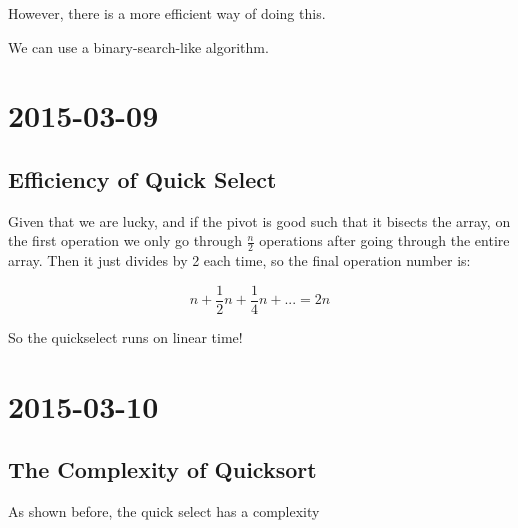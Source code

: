 \documentclass [12 pt, twoside] {article}
\begin{document}
However, there is a more efficient way of doing this.

We can use a binary-search-like algorithm. 

\section{2015-03-09}
\subsection{Efficiency of Quick Select}

Given that we are lucky, and if the pivot is good such that it bisects the
array, on the first operation we only go through $\frac{n}{2}$ operations after
going through the entire array. Then it just divides by 2 each time, so the
final operation number is:

$$n + \frac{1}{2}n + \frac{1}{4}n + ... = 2n$$

So the quickselect runs on linear time!

\section{2015-03-10}
\subsection{The Complexity of Quicksort}
As shown before, the quick select has a complexity 
\end{document}
